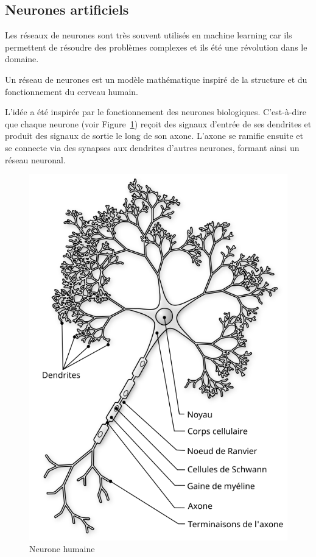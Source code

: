 \clearpage
\subsection{Neurones artificiels}

\par{Les réseaux de neurones sont très souvent utilisés en machine learning car ils permettent de résoudre des problèmes complexes et ils été une révolution dans le domaine.}

\par{Un réseau de neurones est un modèle mathématique inspiré de la structure et du fonctionnement du cerveau humain.}

\par{L'idée a été inspirée par le fonctionnement des neurones biologiques. C'est-à-dire que chaque neurone (voir Figure~\ref{fig:A1_02_neurone_humaine}) reçoit des signaux d'entrée de ses dendrites et produit des signaux de sortie le long de son axone. L'axone se ramifie ensuite et se connecte via des synapses aux dendrites d'autres neurones, formant ainsi un réseau neuronal.}

\begin{figure}[H]
    \centering
    \includegraphics[width=0.85\linewidth]{03-tail//A1_fondamentaux_ML//A1_figures/A1_02_neurone_humaine.png}
    \caption{Neurone humaine \cite{noauthor_neurone_2025}}
    \label{fig:A1_02_neurone_humaine}
\end{figure}

